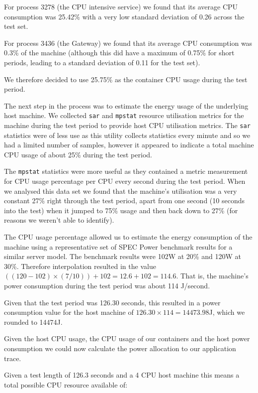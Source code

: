 For process 3278 (the CPU intensive service) we found that its average CPU consumption was 25.42\% with a very low standard deviation of 0.26 across the test set.

For process 3436 (the Gateway) we found that its average CPU consumption was 0.3\% of the machine (although this did have a maximum of 0.75\% for short periods, leading to a standard deviation of 0.11 for the test set).

We therefore decided to use 25.75\% as the container CPU usage during the test period.

The next step in the process was to estimate the energy usage of the underlying host machine.  We collected \texttt{sar} and \texttt{mpstat} resource utilisation metrics for the machine during the test period to provide host CPU utilisation metrics.  The \texttt{sar} statistics were of less use as this utility collects statistics every minute and so we had a limited number of samples, however it appeared to indicate a total machine CPU usage of about 25\% during the test period.

The \texttt{mpstat} statistics were more useful as they contained a metric measurement for CPU usage percentage per CPU every second during the test period.  When we analysed this data set we found that the machine's utilisation was a very constant 27\% right through the test period, apart from one second (10 seconds into the test) when it jumped to 75\% usage and then back down to 27\% (for reasons we weren't able to identify).

The CPU usage percentage allowed us to estimate the energy consumption of the machine using a representative set of SPEC Power benchmark results for a similar server model.  The benchmark results were 102W at 20\% and 120W at 30\%.  Therefore interpolation resulted in the value $((120 - 102) \times (7/10)) + 102 = 12.6 + 102 = 114.6$.  That is, the machine's power consumption during the test period was about 114 J/second.

Given that the test period was 126.30 seconds, this resulted in a power consumption value for the host machine of $126.30 \times 114 = 14473.98$J, which we rounded to 14474J.

Given the host CPU usage, the CPU usage of our containers and the host power consumption we could now calculate the power allocation to our application trace.

Given a test length of 126.3 seconds and a 4 CPU host machine this means a total possible CPU resource available of:


